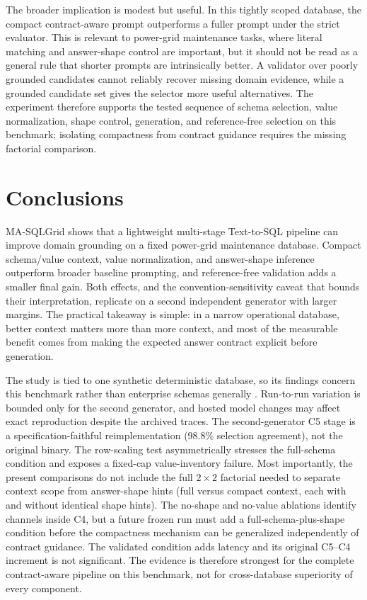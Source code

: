 \documentclass[applsci,article,submit,moreauthors]{Definitions/mdpi}
\begin{document}
The broader implication is modest but useful. In this tightly scoped database, the compact contract-aware prompt outperforms a fuller prompt under the strict evaluator. This is relevant to power-grid maintenance tasks, where literal matching and answer-shape control are important, but it should not be read as a general rule that shorter prompts are intrinsically better. A validator over poorly grounded candidates cannot reliably recover missing domain evidence, while a grounded candidate set gives the selector more useful alternatives. The experiment therefore supports the tested sequence of schema selection, value normalization, shape control, generation, and reference-free selection on this benchmark; isolating compactness from contract guidance requires the missing factorial comparison.

\section{Conclusions}\label{conclusion}

MA-SQLGrid shows that a lightweight multi-stage Text-to-SQL pipeline can improve domain grounding on a fixed power-grid maintenance database. Compact schema/value context, value normalization, and answer-shape inference outperform broader baseline prompting, and reference-free validation adds a smaller final gain. Both effects, and the convention-sensitivity caveat that bounds their interpretation, replicate on a second independent generator with larger margins. The practical takeaway is simple: in a narrow operational database, better context matters more than more context, and most of the measurable benefit comes from making the expected answer contract explicit before generation.

The study is tied to one synthetic deterministic database, so its findings concern this benchmark rather than enterprise schemas generally \cite{zhong2020semantic,lei2024spider}. Run-to-run variation is bounded only for the second generator, and hosted model changes may affect exact reproduction despite the archived traces. The second-generator C5 stage is a specification-faithful reimplementation (98.8\% selection agreement), not the original binary. The row-scaling test asymmetrically stresses the full-schema condition and exposes a fixed-cap value-inventory failure. Most importantly, the present comparisons do not include the full $2\times2$ factorial needed to separate context scope from answer-shape hints (full versus compact context, each with and without identical shape hints). The no-shape and no-value ablations identify channels inside C4, but a future frozen run must add a full-schema-plus-shape condition before the compactness mechanism can be generalized independently of contract guidance. The validated condition adds latency and its original C5--C4 increment is not significant. The evidence is therefore strongest for the complete contract-aware pipeline on this benchmark, not for cross-database superiority of every component.
\end{document}

